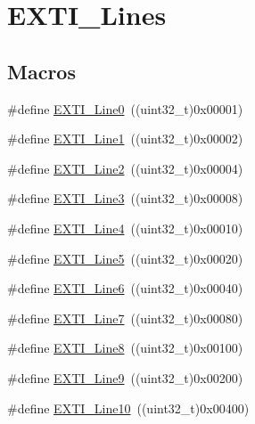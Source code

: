\hypertarget{group___e_x_t_i___lines}{}\section{E\+X\+T\+I\+\_\+\+Lines}
\label{group___e_x_t_i___lines}
\subsection*{Macros}
\begin{DoxyCompactItemize}
\item 
\#define \mbox{\hyperlink{group___e_x_t_i___lines_gac2a65680200dd5f4f7eab29cd4091a75}{E\+X\+T\+I\+\_\+\+Line0}}~((uint32\+\_\+t)0x00001)
\item 
\#define \mbox{\hyperlink{group___e_x_t_i___lines_gae7c6ab2a0880ce3810641ee0585104cd}{E\+X\+T\+I\+\_\+\+Line1}}~((uint32\+\_\+t)0x00002)
\item 
\#define \mbox{\hyperlink{group___e_x_t_i___lines_gaec4189bb2709c8c15a0339d1b0b9865a}{E\+X\+T\+I\+\_\+\+Line2}}~((uint32\+\_\+t)0x00004)
\item 
\#define \mbox{\hyperlink{group___e_x_t_i___lines_gadea3ef6ab7e8bacc686689de8711b98c}{E\+X\+T\+I\+\_\+\+Line3}}~((uint32\+\_\+t)0x00008)
\item 
\#define \mbox{\hyperlink{group___e_x_t_i___lines_gab33b1fe19306e9e60f8f8d0928b800be}{E\+X\+T\+I\+\_\+\+Line4}}~((uint32\+\_\+t)0x00010)
\item 
\#define \mbox{\hyperlink{group___e_x_t_i___lines_ga6b4c6292e3abd521cab2bf99d37a15c6}{E\+X\+T\+I\+\_\+\+Line5}}~((uint32\+\_\+t)0x00020)
\item 
\#define \mbox{\hyperlink{group___e_x_t_i___lines_ga97a5145d1d2612dd53bdd9db3d366873}{E\+X\+T\+I\+\_\+\+Line6}}~((uint32\+\_\+t)0x00040)
\item 
\#define \mbox{\hyperlink{group___e_x_t_i___lines_ga3b7155d54a4a98394b599718901ccbe5}{E\+X\+T\+I\+\_\+\+Line7}}~((uint32\+\_\+t)0x00080)
\item 
\#define \mbox{\hyperlink{group___e_x_t_i___lines_gacd51e087a088c3315049394cddf79e88}{E\+X\+T\+I\+\_\+\+Line8}}~((uint32\+\_\+t)0x00100)
\item 
\#define \mbox{\hyperlink{group___e_x_t_i___lines_ga340ca6bb77b7a2d7747c78e7d3370360}{E\+X\+T\+I\+\_\+\+Line9}}~((uint32\+\_\+t)0x00200)
\item 
\#define \mbox{\hyperlink{group___e_x_t_i___lines_gaefb90b266f5fc1571ed4606bbff1f1d7}{E\+X\+T\+I\+\_\+\+Line10}}~((uint32\+\_\+t)0x00400)
\item 

\end{DoxyCompactItemize}
